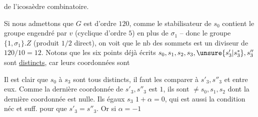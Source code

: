 de l'icosaèdre combinatoire.

Si nous admettons que $G$ est  d'ordre $120$, comme le stabilisateur de $s_0$ contient le groupe  engendré par $v$ (cyclique d'ordre $5$) en plus de $\sigma_1$ -- donc le groupe  $\{1,\sigma_1\}.Z$ (produit $1/2$ direct), on voit que le nb des sommets est un diviseur de $120/10=12$. Notons que les six points déjà écrits $s_0,s_1,s_2,s_3,\unsure{s'_3|s_3^*},s''_3$ sont \uline{distincts}, car leurs coordonnées sont

 Il est clair que $s_0$ à $s_3$ sont tous distincts, il faut  les comparer à $s'_3,s''_3$ et  entre eux. Comme la dernière coordonnée de $s'_3,s''_3$  est $1$, ils sont $\ne s_0,s_1,s_2$ dont la dernière coordonnée est nulle. Ils  égaux  $s_3$  $1+\alpha=0$, qui est  aussi la condition néc et suff. pour que $s'_3=s''_3$. Or  si $\alpha=-1$
